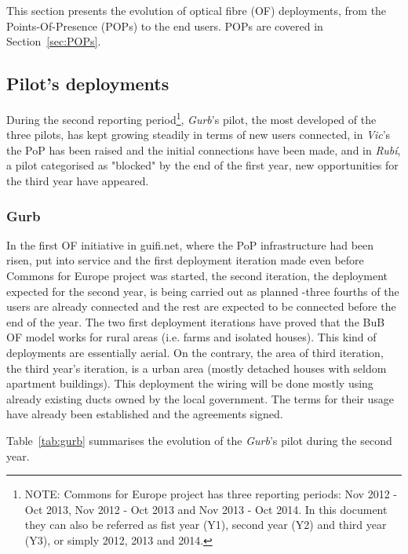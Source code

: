 This section presents the evolution of optical fibre (OF) deployments, from the Points-Of-Presence (POPs) to the end users. POPs are covered in Section~\ref{sec:POPs}.

\subsection{Pilot's deployments}
\label{dep_pilots}

During the second reporting period\footnote{NOTE: Commons for Europe project has three reporting periods: Nov 2012 - Oct 2013, Nov 2012 - Oct 2013 and Nov 2013 - Oct 2014. In this document they can also be referred as fist year (Y1), second year (Y2) and third year (Y3), or simply 2012, 2013 and 2014.}, \emph{Gurb}'s pilot, the most developed of the three pilots, has kept growing steadily in terms of new users connected, in \emph{Vic}'s the PoP has been raised and the initial connections have been made, and in \emph{Rub\'{i}}, a pilot categorised as "blocked" by the end of the first year, new opportunities for the third year have appeared.


\FloatBarrier

\subsubsection{Gurb}
\label{dep_gurb}

In the first OF initiative in guifi.net, where the PoP infrastructure had been risen, put into service and the first deployment iteration made even before Commons for Europe project was started, the second iteration, the deployment expected for the second year, is being carried out as planned -three fourths of the users are already connected and the rest are expected to be connected before the end of the year. The two first deployment iterations have proved that the BuB OF model works for rural areas (i.e. farms and isolated houses). This kind of deployments are essentially aerial. On the contrary, the area of third iteration, the third year's iteration, is a urban area (mostly detached houses with seldom apartment buildings). This deployment the wiring will be done mostly using already existing ducts owned by the local government. The terms for their usage have already been established and the agreements signed.

Table~\ref{tab:gurb} summarises the evolution of the \emph{Gurb}'s pilot during the second year. 

